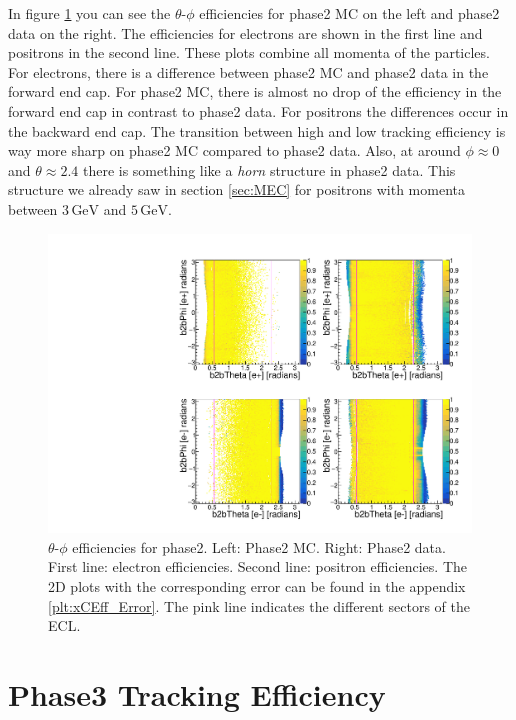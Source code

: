 \documentclass[a4paper,11pt,twosided,final,german,openbib,pdftex,listof=totoc,bibliography=totoc]{scrbook}
\begin{document}
In figure \ref{plt:xCEff} you can see the $\theta$-$\phi$ efficiencies for phase2 MC on the left and phase2 data on the right. The efficiencies for electrons are shown in the first line and positrons in the second line. These plots combine all momenta of the particles. For electrons, there is a difference between phase2 MC and phase2 data in the forward end cap. For phase2 MC, there is almost no drop of the efficiency in the forward end cap in contrast to phase2 data. For positrons the differences occur in the backward end cap. The transition between high and low tracking efficiency is way more sharp on phase2 MC compared to phase2 data. Also, at around $\phi \approx 0$ and $\theta \approx 2.4$ there is something like a \textit{horn} structure in phase2 data. This structure we already saw in section \ref{sec:MEC} for positrons with momenta between $3\,\textrm{GeV}$ and $5\,\textrm{GeV}$.




\begin{figure}[!htbp]
	\centering
	\includegraphics[width=\textwidth]{Plots/master/xCEffTP_MCData.pdf}
	\caption[$\theta$-$\phi$ Efficiency Plots Phase2]{$\theta$-$\phi$ efficiencies for phase2. Left: Phase2 MC. Right: Phase2 data. First line: electron efficiencies. Second line: positron efficiencies. The 2D plots with the corresponding error can be found in the appendix \ref{plt:xCEff_Error}. The pink line indicates the different sectors of the ECL.}
	\label{plt:xCEff}
\end{figure}


\chapter{Phase3 Tracking Efficiency}
\label{chp:TrackingEfficiencyPhase3}
\end{document}
